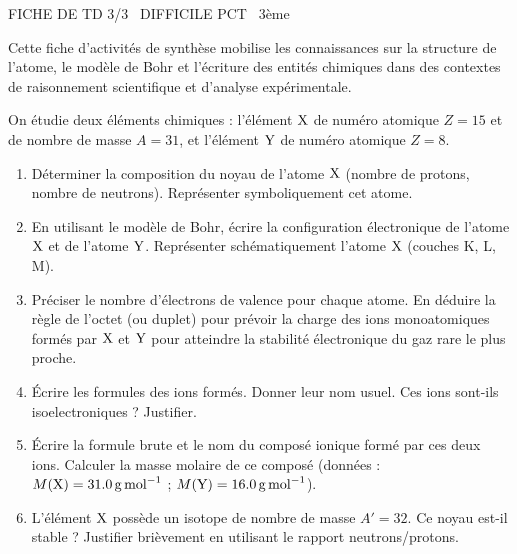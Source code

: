\documentclass[11pt]{article}
\begin{document}
\begin{tcolorbox}[enhanced,colback=popink,colframe=popink,arc=10pt,boxrule=0pt,left=12pt,right=12pt,top=9pt,bottom=9pt]
{\color{white}\popxbold\small FICHE DE TD 3/3 \textbullet\ DIFFICILE \hfill PCT \textbullet\ 3ème\par}
\end{tcolorbox}
\vspace{4pt}
Cette fiche d'activités de synthèse mobilise les connaissances sur la structure de l'atome, le modèle de Bohr et l'écriture des entités chimiques dans des contextes de raisonnement scientifique et d'analyse expérimentale.

\begin{exercice}
On étudie deux éléments chimiques : l'élément $\ce{X}$ de numéro atomique $Z=15$ et de nombre de masse $A=31$, et l'élément $\ce{Y}$ de numéro atomique $Z=8$.
\begin{enumerate}
    \item Déterminer la composition du noyau de l'atome $\ce{X}$ (nombre de protons, nombre de neutrons). Représenter symboliquement cet atome.
    \item En utilisant le modèle de Bohr, écrire la configuration électronique de l'atome $\ce{X}$ et de l'atome $\ce{Y}$. Représenter schématiquement l'atome $\ce{X}$ (couches K, L, M).
    \item Préciser le nombre d'électrons de valence pour chaque atome. En déduire la règle de l'octet (ou duplet) pour prévoir la charge des ions monoatomiques formés par $\ce{X}$ et $\ce{Y}$ pour atteindre la stabilité électronique du gaz rare le plus proche.
    \item Écrire les formules des ions formés. Donner leur nom usuel. Ces ions sont-ils isoelectroniques ? Justifier.
    \item Écrire la formule brute et le nom du composé ionique formé par ces deux ions. Calculer la masse molaire de ce composé (données : $M(\ce{X}) = \SI{31,0}{g.mol^{-1}}$ ; $M(\ce{Y}) = \SI{16,0}{g.mol^{-1}}$).
    \item L'élément $\ce{X}$ possède un isotope de nombre de masse $A'=32$. Ce noyau est-il stable ? Justifier brièvement en utilisant le rapport neutrons/protons.
\end{enumerate}
\end{exercice}
\end{document}
